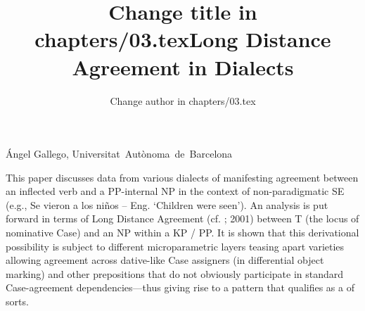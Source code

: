 \documentclass[output=paper]{langsci/langscibook}
\author{Change author in chapters/03.tex}
\title{Change title in chapters/03.tex}
\begin{document}
\title{Long Distance Agreement in  Dialects}

 

 

 

 

 

 

 

 

 

 

 

Ángel Gallego, Universitat~Autònoma~de~Barcelona

\begin{stylelsAbstract}
This paper discusses data from various dialects of  manifesting agreement between an inflected verb and a PP-internal NP in the context of non-paradigmatic SE (e.g., Se vieron a los niños – Eng. ‘Children were seen’). An analysis is put forward in terms of Long Distance Agreement (cf. \citealt{Chomsky2000}; 2001) between T (the locus of nominative Case) and an NP  within a KP / PP. It is shown that this derivational possibility is subject to different microparametric layers teasing apart varieties allowing agreement across dative-like Case assigners (in differential object marking) and other prepositions that do not obviously participate in standard Case-agreement dependencies—thus giving rise to a pattern that qualifies as a  of sorts.
\end{stylelsAbstract}
\end{document}
